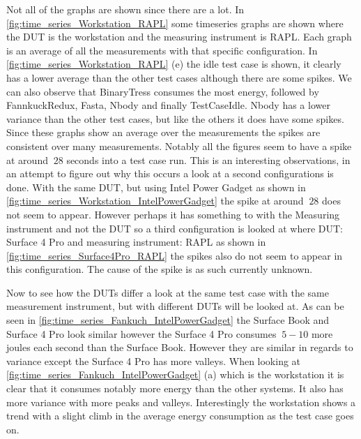 Not all of the graphs are shown since there are a lot. In \cref{fig:time_series_Workstation_RAPL} some timeseries graphs are shown where the DUT is the workstation and the measuring instrument is RAPL. Each graph is an average of all the measurements with that specific configuration. In \cref{fig:time_series_Workstation_RAPL} (e) the idle test case is shown, it clearly has a lower average than the other test cases although there are some spikes. We can also observe that BinaryTress consumes the most energy, followed by FannkuckRedux, Fasta, Nbody and finally TestCaseIdle. Nbody has a lower variance than the other test cases, but like the others it does have some spikes. Since these graphs show an average over the measurements the spikes are consistent over many measurements. Notably all the figures seem to have a spike at around $~28$ seconds into a test case run. This is an interesting observations, in an attempt to figure out why this occurs a look at a second configurations is done. With the same DUT, but using Intel Power Gadget as shown in \cref{fig:time_series_Workstation_IntelPowerGadget} the spike at around $~28$ does not seem to appear. However perhaps it has something to with the Measuring instrument and not the DUT so a third configuration is looked at where DUT: Surface 4 Pro and measuring instrument: RAPL as shown in \cref{fig:time_series_Surface4Pro_RAPL} the spikes also do not seem to appear in this configuration. The cause of the spike is as such currently unknown.\nytafsnit


%
%


%

Now to see how the DUTs differ a look at the same test case with the same measurement instrument, but with different DUTs will be looked at. As can be seen in \cref{fig:time_series_Fankuch_IntelPowerGadget} the Surface Book and Surface 4 Pro look similar however the Surface 4 Pro consumes $~5-10$ more joules each second than the Surface Book. However they are similar in regards to variance except the Surface 4 Pro has more valleys. When looking at \cref{fig:time_series_Fankuch_IntelPowerGadget} (a) which is the workstation it is clear that it consumes notably more energy than the other systems. It also has more variance with more peaks and valleys. Interestingly the workstation shows a trend with a slight climb in the average energy consumption as the test case goes on.

